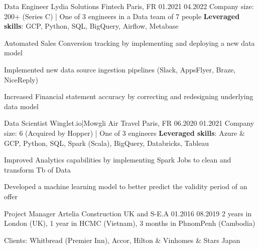 \begin{cventries}
\cventry
{Data Engineer} %
{Lydia Solutions} %
{Fintech} %
{Paris, FR} %
{01.2021} %
{04.2022} %
{Company size: 200+ (Series C) | One of 3 engineers in a Data team of 7 people} %
{\textbf{Leveraged skills}: GCP, Python, SQL, BigQuery, Airflow, Metabase} %
{
  \begin{cvitems} %
    \item {Automated Sales Conversion tracking by implementing and deploying a new data model }
    \item {Implemented new data source ingestion pipelines (Slack, AppsFlyer, Braze, NiceReply)}
    \item {Increased Financial statement accuracy by correcting and redesigning underlying data model}
  \end{cvitems}
}

  \cventry
    {Data Scientist} %
    {Winglet.io|Mowgli} %
    {Air Travel} %
    {Paris, FR} %
    {06.2020} %
    {01.2021} %
    {Company size: 6 (Acquired by Hopper) | One of 3 engineers  } %
    {\textbf{Leveraged skills}: Azure \& GCP, Python, SQL, Spark (Scala), BigQuery, Databricks, Tableau} %
    {
      \begin{cvitems} %
       \item {Improved Analytics capabilities by implementing Spark Jobs to clean and transform Tb of Data}
       \item {Developed a machine learning model to better predict the validity period of an offer}
      \end{cvitems}
    }

  \cventry
    {Project Manager} %
    {Artelia} %
    {Construction}%
    {UK and S-E.A} %
    {01.2016} %
    {08.2019} %
    {2 years in London (UK), 1 year in HCMC (Vietnam), 3 months in PhnomPenh (Cambodia) } %
    {} %
    {
      \begin{cvitems} %
        \item {Clients: Whitbread (Premier Inn), Accor, Hilton \& Vinhomes \& Stars Japan} 
      \end{cvitems}
    }

\end{cventries}
